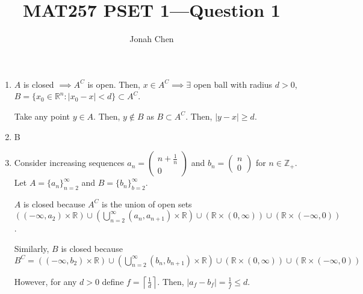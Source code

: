 \documentclass[a4paper]{article}
\title{MAT257 PSET 1---Question 1}
\author{Jonah Chen}
\numberwithin{equation}{section}
\newcommand{\R}{\mathbb{R}}
\begin{document}
    \sffamily
    \begin{enumerate}[label=(\alph*)]
        \item $A$ is closed $\implies A^C$ is open. Then, $x\in A^C\implies\exists$ open ball with radius $d>0$, $B=\{x_0\in\R^n: |x_0-x|<d\}\subset A^C$. 
        
        Take any point $y\in A$. Then, $y\notin B$ as $B\subset A^C$. Then, $|y-x|\geq d$.
        \item B
        \item Consider increasing sequences $a_n=\begin{pmatrix}
            n+\frac{1}{n}\\0
        \end{pmatrix}$ and $b_n=\begin{pmatrix}
            n\\0
        \end{pmatrix}$ for $n\in\mathbb Z_+$. Let $A=\{a_n\}_{n=2}^\infty$ and $B=\{b_n\}_{b=2}^\infty$.
        
        $A$ is closed because $A^C$ is the union of open sets $\left((-\infty,a_2)\times\R\right)\cup\left(\bigcup_{n=2}^\infty(a_n, a_{n+1})\times\R\right)\cup(\R\times (0,\infty))\cup(\R\times(-\infty,0))$. 
        
        Similarly, $B$ is closed because $B^C=\left((-\infty,b_2)\times\R\right)\cup\left(\bigcup_{n=2}^\infty(b_n, b_{n+1})\times\R\right)\cup(\R\times (0,\infty))\cup(\R\times(-\infty,0))$
        
        However, for any $d>0$ define $f=\left\lceil\frac{1}{d}\right\rceil$. Then, $|a_f-b_f|=\frac{1}{f}\leq d$.
    \end{enumerate}
\end{document}
